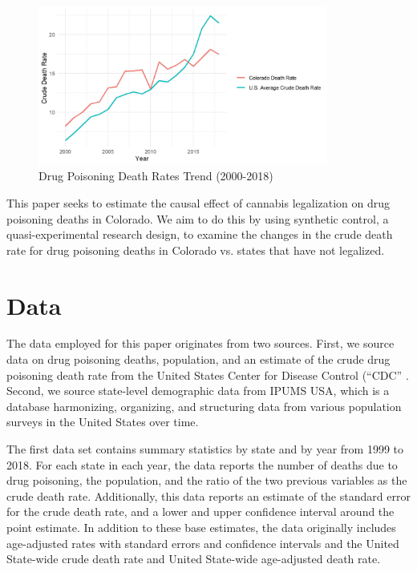\documentclass{article}
\begin{document}
\begin{figure}[H]
	\begin{center}
		\includegraphics[width=0.85\textwidth]{death_rates_trend}
	\end{center}
	\caption{Drug Poisoning Death Rates Trend (2000-2018)}
	\label{fig:death_rates_trend}
\end{figure}

This paper seeks to estimate the causal effect of cannabis legalization on drug poisoning deaths in Colorado. We aim to do this by using synthetic control, a quasi-experimental research design, to examine the changes in the crude death rate for drug poisoning deaths in Colorado vs. states that have not legalized. 

\section{Data}

The data employed for this paper originates from two sources. First, we source data on drug poisoning deaths, population, and an estimate of the crude drug poisoning death rate from the United States Center for Disease Control (``CDC'' \citep{cdc}. Second, we source state-level demographic data from IPUMS USA, which is a database harmonizing, organizing, and structuring data from various population surveys in the United States over time.\citep{ipums}

The first data set contains summary statistics by state and by year from 1999 to 2018. For each state in each year, the data reports the number of deaths due to drug poisoning, the population, and the ratio of the two previous variables as the crude death rate. Additionally, this data reports an estimate of the standard error for the crude death rate, and a lower and upper confidence interval around the point estimate. In addition to these base estimates, the data originally includes age-adjusted rates with standard errors and confidence intervals and the United State-wide crude death rate and United State-wide age-adjusted death rate. 
\end{document}
